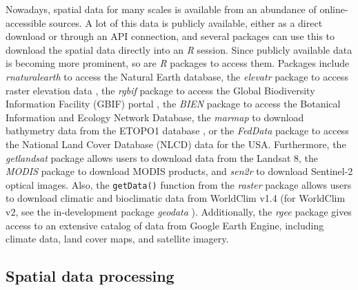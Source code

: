 \documentclass[smallextended]{svjour3}       %
\begin{document}
Nowadays, spatial data for many scales is available from an abundance of online-accessible sources.
A lot of this data is publicly available, either as a direct download or through an API connection, and several packages can use this to download the spatial data directly into an \emph{R} session.
Since publicly available data is becoming more prominent, so are \emph{R} packages to access them.
Packages include \emph{rnaturalearth} \cite{South2017} to access the Natural Earth database, the \emph{elevatr} package to access raster elevation data \cite{R-elevatr}, the \emph{rgbif} package to access the Global Biodiversity Information Facility (GBIF) portal \cite{R-rgbif}, the \emph{BIEN} package \cite{Maitner2020} to access the Botanical Information and Ecology Network Database, the \emph{marmap} to download bathymetry data from the ETOPO1 database \cite{Pante2013}, or the \emph{FedData} package \cite{R-FedData} to access the National Land Cover Database (NLCD) data for the USA.
Furthermore, the \emph{getlandsat} package \cite{Chamberlain2018} allows users to download data from the Landsat 8, the \emph{MODIS} package \cite{Mattiuzzi2020} to download MODIS products, and \emph{sen2r} \cite{R-sen2r} to download Sentinel-2 optical images.
Also, the \texttt{getData()} function from the \emph{raster} package allows users to download climatic and bioclimatic data from WorldClim v1.4 (for WorldClim v2, see the in-development package \emph{geodata} ).
Additionally, the \emph{rgee} package \cite{R-rgee} gives access to an extensive catalog of data from Google Earth Engine, including climate data, land cover maps, and satellite imagery.

\hypertarget{spatial-data-processing}{%
\subsection{Spatial data processing}\label{spatial-data-processing}}
\end{document}
